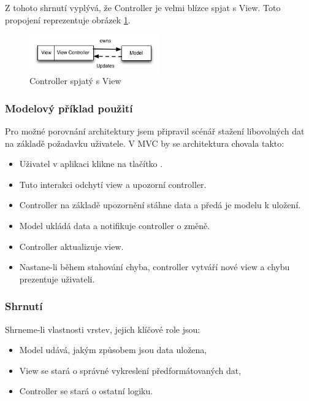 Z tohoto shrnutí vyplývá, že Controller je velmi blízce spjat s View. Toto propojení reprezentuje obrázek \ref{fig:massive-mvc}.

\begin{figure}\centering
	\includegraphics[width=0.5\textwidth]{assets/mvc-massive-view-controller.png}
	\caption[Role Controlleru v MVC]{Controller spjatý s View}\label{fig:massive-mvc}
\end{figure}

\subsubsection{Modelový příklad použití}

Pro možné porovnání architektury jsem připravil scénář stažení libovolných dat na základě požadavku uživatele.
V MVC by se architektura chovala takto:

\begin{itemize}
  \item Uživatel v aplikaci klikne na tlačítko .
  \item Tuto interakci odchytí view a upozorní controller.
  \item Controller na základě upozornění stáhne data a předá je modelu k uložení.
  \item Model ukládá data a notifikuje controller o změně.
  \item Controller aktualizuje view.
  \item Nastane-li během stahování chyba, controller vytváří nové view a chybu prezentuje uživateli.
\end{itemize}


\subsubsection{Shrnutí}

Shrneme-li vlastnosti vrstev, jejich klíčové role jsou:

\begin{itemize}
  \item Model udává, jakým způsobem jsou data uložena,
  \item View se stará o správné vykreslení předformátovaných dat,
  \item Controller se stará o ostatní logiku.
\end{itemize}

